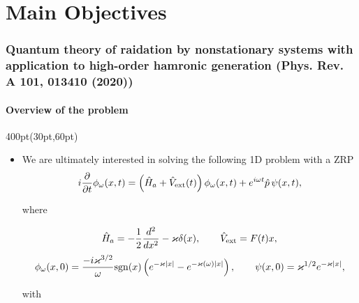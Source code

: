 \section{Main Objectives}

\begin{frame}
\frametitle{Quantum theory of raidation by nonstationary systems 
	with application to high-order hamronic generation
        (Phys. Rev. A 101, 013410 (2020))}
	\framesubtitle{Overview of the problem}
\footnotesize
\begin{textblock*}{400pt}(30pt,60pt)
\begin{itemize}
\item We are ultimately interested in solving 
the following 1D problem with a ZRP
\begin{equation}
	i\frac{\partial}{\partial t}\phi_\omega(x,t)
	   = \left( \hat{H}_a + \hat{V}_{\rm ext}(t)\right) 
	   \phi_\omega (x,t)
 	   + e^{i\omega t} {\hat{p}}\,
	   \psi(x,t), \label{eqn:main_1d}
\end{equation}

where

\begin{equation}
  \hat{H}_a = -\frac{1}{2}\frac{d^2}{dx^2} - \varkappa\delta(x), 
\hspace{20pt}  \hat{V}_{\rm ext} = F(t)x,
\end{equation}
\begin{equation}
  \phi_\omega (x,0) = \frac{-i\varkappa^{3/2}}{\omega}
{\rm sgn}(x)\left(e^{-\varkappa|x|} - e^{-\varkappa(\omega)|x|}\right), 
\hspace{20pt}  \psi(x,0) = \varkappa^{1/2}e^{-\varkappa|x|}, 
\label{eqn:bound_state0}
\end{equation}

with


\end{itemize}
\end{textblock*}
\end{frame}
